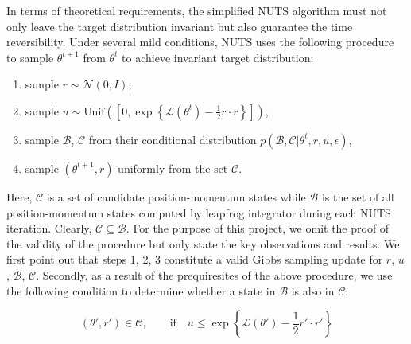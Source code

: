 \documentclass{article}
\begin{document}
\par In terms of theoretical requirements, the simplified NUTS algorithm must not only leave the target distribution invariant but also guarantee the time reversibility. Under several mild conditions, NUTS uses the following procedure to sample $\theta^{t+1}$ from $\theta^{t}$ to achieve invariant target distribution:
\begin{enumerate}
\item sample $r\sim\mathcal{N}(0,I)$,
\item sample $u\sim\text{Unif}\left(\left[0,\exp\left\{\mathcal{L}(\theta^t)-\frac{1}{2}r\cdot{r}\right\}\right]\right)$,
\item sample $\mathcal{B}$, $\mathcal{C}$ from their conditional distribution $p(\mathcal{B},\mathcal{C}|\theta^t,r,u,\epsilon)$,
\item sample $\left(\theta^{t+1},r \right)$ uniformly from the set $\mathcal{C}$.
\end{enumerate}
\noindent Here, $\mathcal{C}$ is a set of candidate position-momentum states while $\mathcal{B}$ is the set of all position-momentum states computed by leapfrog integrator during each NUTS iteration. Clearly, $\mathcal{C}\subseteq\mathcal{B}$. For the purpose of this project, we omit the proof of the validity of the procedure but only state the key observations and results. We first point out that steps 1, 2, 3 constitute a valid Gibbs sampling update for $r$, $u$, $\mathcal{B}$, $\mathcal{C}$. Secondly,
as a result of the prequiresites of the above procedure, we use the following condition to determine whether a state in $\mathcal{B}$ is also in $\mathcal{C}$:

\begin{equation}
(\theta',r')\in\mathcal{C},\qquad \text{if}\quad u\leq \exp\left\{\mathcal{L}(\theta')-\frac{1}{2}r'\cdot r'\right\}
\label{cond1} \tag{C.1}
\end{equation}

\end{document}
